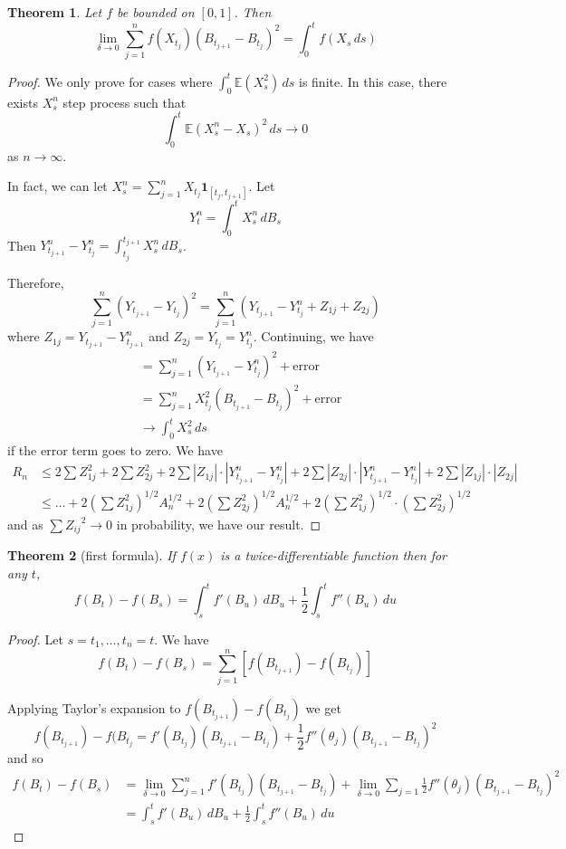 \documentclass[10pt, oneside, reqno]{amsart}
\theoremstyle{plain}%
\newtheorem{thm}{Theorem}[section]
\theoremstyle{definition}
\theoremstyle{remark}
\newcommand{\E}{\mathbb{E}}
\begin{document}
\begin{thm}
	Let $f$ be bounded on $[0,1]$.  Then \[
		\lim_{\delta \rightarrow 0} \sum_{j=1}^n f(X_{t_j})(B_{t_{j+1}} - B_{t_j})^2 = \int_0^t f(X_s \, ds)
	\]
\end{thm}
\begin{proof}
	We only prove for cases where $\int_0^t \E(X_s^2) \, ds$ is finite.  In this case, there exists $X_s^n$ step process such that \[
		\int_0^t \E(X_s^n - X_s)^2 \, ds \rightarrow 0
	\] as $n \rightarrow \infty$.  
	
	In fact, we can let $X_s^n = \sum_{j=1}^n X_{t_j}  \mathbf{1}_{[t_j, t_{j+1}]}$.  Let \[
		Y_t^n = \int_0^t X_s^n \, dB_s
	\]  Then $Y_{t_{j+1}}^n - Y_{t_j}^n = \int_{t_j}^{t_{j+1}} X_s^n \, dB_s$.  

	Therefore, \[
		\sum_{j=1}^n (Y_{t_{j+1}} - Y_{t_j})^2 = \sum_{j=1}^n (Y_{t_{j+1}} - Y^n_{t_{j}} + Z_{1j} + Z_{2j} )
	\] where $Z_{1j} = Y_{t_{j+1}} - Y_{t_{j+1}}^n$ and $Z_{2j} = Y_{t_j} = Y_{t_{j}}^n$.  Continuing, we have \begin{align*}
		&= \sum_{j=1}^n (Y_{t_{j+1}} - Y_{t_{j}}^n)^2 + \text{error} \\
		&= \sum_{j=1}^n X_{t_j}^2 (B_{t_{j+1}} - B_{t_j})^2 + \text{error} \\
		&\rightarrow \int_0^t X_s^2 \, ds
	\end{align*} if the error term goes to zero.  We have \begin{align*}
		R_n &\leq 2 \sum Z_{1j}^2 + 2 \sum Z_{2j}^2 + 2 \sum |Z_{1j} | \cdot | Y_{t_{j+1}}^n - Y_{t_j}^n | + 2 \sum |Z_{2j} | \cdot | Y_{t_{j+1}}^n - Y_{t_j}^n | + 2 \sum |Z_{1j} | \cdot |Z_{2j} | \\
		&\leq \dots + 2 (\sum Z_{1j}^2 )^{1/2} A_n^{1/2} + 2 (\sum Z_{2j}^2 )^{1/2} A_n^{1/2} + 2  (\sum Z_{1j}^2 )^{1/2} \cdot  (\sum Z_{2j}^2 )^{1/2} 
	\end{align*}
	and as $\sum {Z_{ij}}^2 \rightarrow 0$ in probability, we have our result.
\end{proof}

\newcommand{\itos}{}
\begin{thm}[\itos first formula]
	If $f(x)$ is a twice-differentiable function then for any $t$, \[
		f(B_t) - f(B_s) = \int_s^t f'(B_u) \, dB_u + \frac{1}{2 } \int_s^t f''(B_u) \, du
	\]
\end{thm}
\begin{proof}
	Let $s = t_1, \dots, t_{n} = t$.  We have \[
		f(B_t) - f(B_s) = \sum_{j=1}^n \left[ f(B_{t_{j+1}}) - f(B_{t_j}) \right]
	\]
	
	Applying Taylor's expansion to $f(B_{t_{j+1}}) - f(B_{t_{j}})$ we get \[
		f(B_{t_{j+1}}) - f(B_{t_j} = f'(B_{t_j}) (B_{t_{j+1}} - B_{t_j}) + \frac{1}{2} f''(\theta_j) (B_{t_{j+1}} - B_{t_j})^2 
	\] and so \begin{align*}
		f(B_t) - f(B_s) &= \lim_{\delta \rightarrow 0} \sum_{j=1}^n 	f'(B_{t_j}) (B_{t_{j+1}} - B_{t_j}) + \lim_{\delta \rightarrow 0} \sum_{j=1} \frac{1}{2} f''(\theta_j) (B_{t_{j+1}} - B_{t_j})^2  \\
		&= \int_s^t f'(B_u) \, dB_u + \frac{1}{2} \int_s^t f''(B_u) \, du
	\end{align*}
\end{proof}
\end{document}
